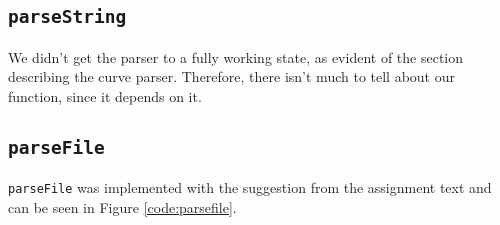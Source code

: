 \subsection{\texttt{parseString}}
We didn't get the parser to a fully working state, as evident of the section
describing the curve parser. Therefore, there isn't much to tell about our
 function, since it depends on it.

\subsection{\texttt{parseFile}}
\texttt{parseFile} was implemented with the suggestion from the assignment text
and can be seen in Figure \ref{code:parsefile}.

